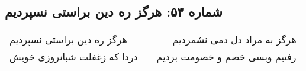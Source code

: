 \begin{center}
\section*{شماره ۵۳: هرگز ره دین براستی نسپردیم}
\label{sec:053}
\begin{longtable}{l p{0.5cm} r}
هرگز ره دین براستی نسپردیم
&&
هرگز به مراد دل دمی نشمردیم
\\
دردا که زغفلت شبانروزی خویش
&&
رفتیم وبسی خصم و خصومت بردیم
\\
\end{longtable}
\end{center}
